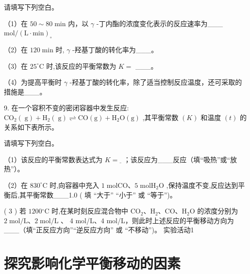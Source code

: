\documentclass[10pt]{article}
\begin{document}
请填写下列空白。

（1）在 \({50} \sim {80}\mathrm{\;{min}}\) 内，以 \(\gamma\) -丁内酯的浓度变化表示的反应速率为\_\_\_ \(\mathrm{{mol}}/{\left( \mathrm{L} \cdot \mathrm{{min}}\right) }_{ \circ }\)

（2）在 \({120}\mathrm{\;{min}}\) 时, \(\gamma\) -羟基丁酸的转化率为\_\_\_。

（3）在 \({25}^{ \circ }\mathrm{C}\) 时,该反应的平衡常数为 \(K =\) \_\_\_。

（4）为提高平衡时 \(\gamma\) -羟基丁酸的转化率，除了适当控制反应温度，还可采取的措施是\_\_\_。

9. 在一个容积不变的密闭容器中发生反应: \({\mathrm{{CO}}}_{2}\left( \mathrm{\;g}\right) + {\mathrm{H}}_{2}\left( \mathrm{\;g}\right) \rightleftharpoons \mathrm{{CO}}\left( \mathrm{g}\right) + {\mathrm{H}}_{2}\mathrm{O}\left( \mathrm{g}\right)\) ,其平衡常数 \(\left( K\right)\) 和温度 \(\left( t\right)\) 的关系如下表所示。

\begin{center}
\end{center}

请填写下列空白。

（1）该反应的平衡常数表达式为 \(K = \underline{\;}\) ；该反应为\_\_\_反应（填“吸热”或“放热”）。

（2）在 \({830}^{ \circ }\mathrm{C}\) 时,向容器中充入 \(1\mathrm{\;{mol}}\mathrm{{CO}}\text{、}5\mathrm{\;{mol}}{\mathrm{H}}_{2}\mathrm{O}\) ,保持温度不变,反应达到平衡后,其平衡常数\_\_\_1.0 ( 填 “大于” “小于” 或 “等于”)。

( 3 ) 若 \({1200}{}^{ \circ }\mathrm{C}\) 时,在某时刻反应混合物中 \({\mathrm{{CO}}}_{2}\text{、}{\mathrm{H}}_{2}\text{、}\mathrm{{CO}}\text{、}{\mathrm{H}}_{2}\mathrm{O}\) 的浓度分别为 \(2\mathrm{\;{mol}}/\mathrm{L}\text{、}2\mathrm{\;{mol}}/\mathrm{L}\) 、 4 mol/L、4 mol/L，则此时上述反应的平衡移动方向为\_\_\_（填“正反应方向”“逆反应方向” 或 “不移动”)。 实验活动1

\section*{探究影响化学平衡移动的因素}
\end{document}

